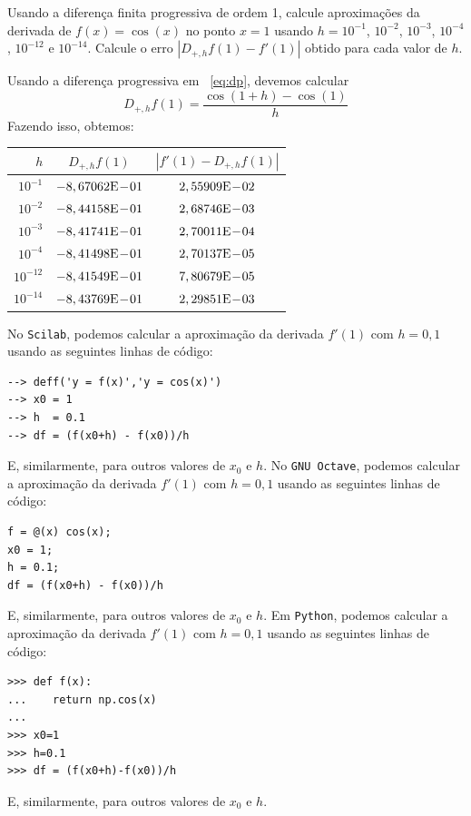 \begin{ex}\label{ex:dp}
Usando a diferença finita progressiva de ordem 1, calcule aproximações da derivada de $f(x)=\cos(x)$ no ponto $x=1$ usando $h=10^{-1}$, $10^{-2}$, $10^{-3}$, $10^{-4}$, $10^{-12}$ e $10^{-14}$. Calcule o erro $|D_{+,h}f(1)-f'(1)|$ obtido para cada valor de $h$.
\end{ex}
\begin{sol}
Usando a diferença progressiva em ~\eqref{eq:dp}, devemos calcular
\begin{equation*}
  D_{+,h}f(1) = \frac{\cos(1 + h) - \cos(1)}{h}
\end{equation*}
Fazendo isso, obtemos:
\begin{center}
  \begin{tabular}{r|c|c}
    $h$        & $D_{+,h}f(1)$   & $|f'(1) - D_{+,h}f(1)|$ \\ \hline
    $10^{-1}$  & $-8,67062\mathrm{E}\!-\!01$ & $2,55909\mathrm{E}\!-\!02$\\
    $10^{-2}$  & $-8,44158\mathrm{E}\!-\!01$ & $2,68746\mathrm{E}\!-\!03$\\
    $10^{-3}$  & $-8,41741\mathrm{E}\!-\!01$ & $2,70011\mathrm{E}\!-\!04$\\
    $10^{-4}$  & $-8,41498\mathrm{E}\!-\!01$ & $2,70137\mathrm{E}\!-\!05$ \\
    $10^{-12}$ & $-8,41549\mathrm{E}\!-\!01$ & $7,80679\mathrm{E}\!-\!05$\\
    $10^{-14}$ & $-8,43769\mathrm{E}\!-\!01$ & $2,29851\mathrm{E}\!-\!03$ \\\hline
  \end{tabular}
\end{center}

\ifisscilab
No \verb+Scilab+, podemos calcular a aproximação da derivada $f'(1)$ com $h=0,1$ usando as seguintes linhas de código:
\begin{verbatim}
--> deff('y = f(x)','y = cos(x)')
--> x0 = 1
--> h  = 0.1
--> df = (f(x0+h) - f(x0))/h
\end{verbatim}
E, similarmente, para outros valores de $x_0$ e $h$.
\fi
\ifisoctave
No \verb+GNU Octave+, podemos calcular a aproximação da derivada $f'(1)$ com $h=0,1$ usando as seguintes linhas de código:
\begin{verbatim}
f = @(x) cos(x);
x0 = 1;
h = 0.1;
df = (f(x0+h) - f(x0))/h
\end{verbatim}
E, similarmente, para outros valores de $x_0$ e $h$.
\fi
\ifispython
Em \verb+Python+, podemos calcular a aproximação da derivada $f'(1)$ com $h=0,1$ usando as seguintes linhas de código:
\begin{verbatim}
>>> def f(x):
...    return np.cos(x)
...
>>> x0=1
>>> h=0.1
>>> df = (f(x0+h)-f(x0))/h
\end{verbatim}
E, similarmente, para outros valores de $x_0$ e $h$.
\fi
\end{sol}

